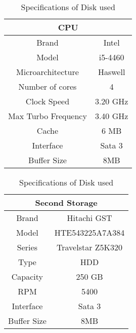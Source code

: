     \begin{table}[!ht]
    \centering
\begin{minipage}[t]{0.48\linewidth}\centering
\begin{tabular}{|c|c|}
\hline
\multicolumn{2}{|c|}{CPU}      \\ \hline
Brand               & Intel    \\ \hline
Model               & i5-4460  \\ \hline
Microarchitecture   & Haswell  \\ \hline
Number of cores     & 4        \\ \hline
Clock Speed         & 3.20 GHz \\ \hline
Max Turbo Frequency & 3.40 GHz \\ \hline
Cache               & 6 MB     \\ \hline
Interface           & Sata 3   \\ \hline
Buffer Size         & 8MB      \\ \hline
\end{tabular}
\caption{Specifications of CPU used}\label{tab:cpuspec}
\end{minipage}\hfill%
\begin{minipage}[t]{0.48\linewidth}\centering
\begin{tabular}{|c|c|}
\hline
\multicolumn{2}{|c|}{Second Storage} \\ \hline
Brand          & Hitachi GST         \\ \hline
Model          & HTE543225A7A384     \\ \hline
Series         & Travelstar Z5K320   \\ \hline
Type           & HDD                 \\ \hline
Capacity       & 250 GB              \\ \hline
RPM            & 5400                \\ \hline
Interface      & Sata 3              \\ \hline
Buffer Size    & 8MB                 \\ \hline
\end{tabular}
\caption{Specifications of Disk used}\label{tab:diskspec}
\end{minipage}
\end{table}